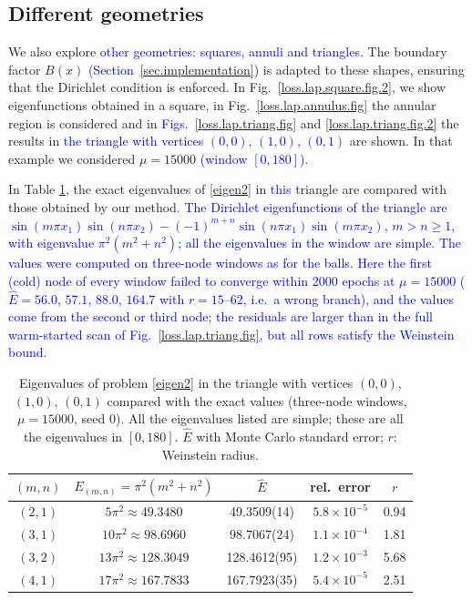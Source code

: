 \documentclass[10pt]{amsart}
\newcommand{\rev}[1]{\textcolor{blue}{#1}}
\theoremstyle{definition}
\theoremstyle{remark}
\theoremstyle{plain}
\begin{document}
\subsection{Different geometries}
We also explore \rev{other geometries: squares, annuli and triangles}. The boundary factor $B(x)$ \rev{(Section~\ref{sec.implementation})} is adapted to these shapes, ensuring that the Dirichlet condition is enforced. In Fig.~\ref{loss.lap.square.fig.2}, we show eigenfunctions obtained in a square, in Fig.~\ref{loss.lap.annulus.fig}  the annular region is considered and in \rev{Figs.}~\ref{loss.lap.triang.fig} and \ref{loss.lap.triang.fig.2} the results in \rev{the triangle with vertices $(0,0)$, $(1,0)$, $(0,1)$} are shown. In that example we considered $\mu=15000$ \rev{(window $[0,180]$)}.

In Table \ref{table.4}, the exact eigenvalues of \eqref{eigen2} in \rev{this} triangle are compared with those obtained by our method. \rev{The Dirichlet eigenfunctions of the triangle are $\sin(m\pi x_1)\sin(n\pi x_2)-(-1)^{m+n}\sin(n\pi x_1)\sin(m\pi x_2)$, $m>n\ge1$, with eigenvalue $\pi^2(m^2+n^2)$; all the eigenvalues in the window are simple. The values were computed on three-node windows as for the balls. Here the first (cold) node of every window failed to converge within 2000 epochs at $\mu=15000$ ($\hat E=56.0$, $57.1$, $88.0$, $164.7$ with $r=15$--$62$, i.e.\ a wrong branch), and the values come from the second or third node; the residuals are larger than in the full warm-started scan of Fig.~\ref{loss.lap.triang.fig}, but all rows satisfy the Weinstein bound.}

\begin{table}[htbp]
\centering\small
\color{blue}
\caption{Eigenvalues of problem \eqref{eigen2} in the triangle with vertices $(0,0)$, $(1,0)$, $(0,1)$ compared with the exact values (three-node windows, $\mu=15000$, seed 0). All the eigenvalues listed are simple; these are all the eigenvalues in $[0,180]$. $\hat E$ with Monte Carlo standard error; $r$: Weinstein radius.}
\label{table.4}
\begin{tabular}{ccccc}
\toprule
$(m,n)$ & $E_{(m,n)} = \pi^2 (m^2 + n^2)$ & $\hat E$ & rel.\ error & $r$\\
\midrule
$(2,1)$ & $5\pi^2\approx 49.3480$ & 49.3509(14) & $5.8\times10^{-5}$ & 0.94\\
$(3,1)$ & $10\pi^2\approx 98.6960$ & 98.7067(24) & $1.1\times10^{-4}$ & 1.81\\
$(3,2)$ & $13\pi^2\approx 128.3049$ & 128.4612(95) & $1.2\times10^{-3}$ & 5.68\\
$(4,1)$ & $17\pi^2\approx 167.7833$ & 167.7923(35) & $5.4\times10^{-5}$ & 2.51\\
\bottomrule
\end{tabular}
\end{table}
\end{document}
